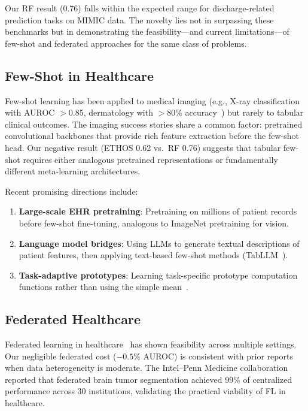 Our RF result (0.76) falls within the expected range for discharge-related prediction tasks on MIMIC data. The novelty lies not in surpassing these benchmarks but in demonstrating the feasibility---and current limitations---of few-shot and federated approaches for the same class of problems.

\subsection{Few-Shot in Healthcare}

Few-shot learning has been applied to medical imaging (e.g., X-ray classification with AUROC $>$0.85, dermatology with $>$80\% accuracy~\cite{prabhu2019few}) but rarely to tabular clinical outcomes. The imaging success stories share a common factor: pretrained convolutional backbones that provide rich feature extraction before the few-shot head. Our negative result (ETHOS 0.62 vs.\ RF 0.76) suggests that tabular few-shot requires either analogous pretrained representations or fundamentally different meta-learning architectures.

Recent promising directions include:
\begin{enumerate}
\item \textbf{Large-scale EHR pretraining}: Pretraining on millions of patient records before few-shot fine-tuning, analogous to ImageNet pretraining for vision.
\item \textbf{Language model bridges}: Using LLMs to generate textual descriptions of patient features, then applying text-based few-shot methods (TabLLM~\cite{hegselmann2023tabllm}).
\item \textbf{Task-adaptive prototypes}: Learning task-specific prototype computation functions rather than using the simple mean~\cite{ye2020few}.
\end{enumerate}

\subsection{Federated Healthcare}

Federated learning in healthcare~\cite{rieke2020future,duan2020federated} has shown feasibility across multiple settings. Our negligible federated cost ($-0.5\%$ AUROC) is consistent with prior reports when data heterogeneity is moderate. The Intel--Penn Medicine collaboration~\cite{sheller2020federated} reported that federated brain tumor segmentation achieved 99\% of centralized performance across 30 institutions, validating the practical viability of FL in healthcare.

